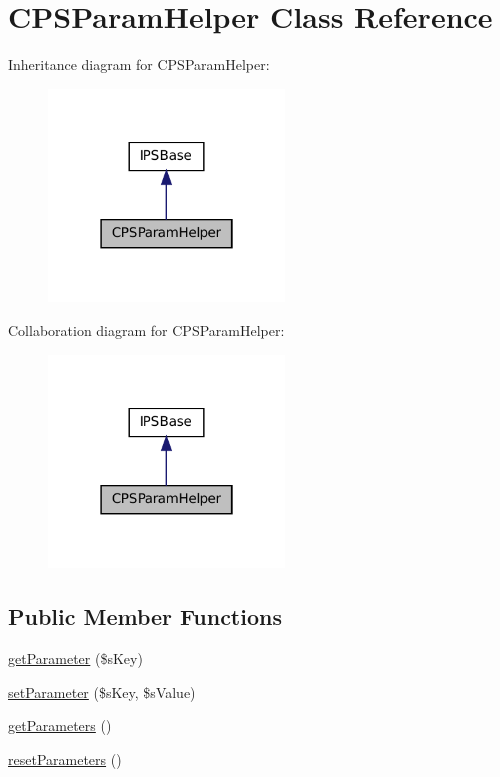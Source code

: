 \hypertarget{classCPSParamHelper}{
\section{CPSParamHelper Class Reference}
\label{classCPSParamHelper}
}


Inheritance diagram for CPSParamHelper:\nopagebreak
\begin{figure}[H]
\begin{center}
\leavevmode
\includegraphics[width=178pt]{classCPSParamHelper__inherit__graph}
\end{center}
\end{figure}


Collaboration diagram for CPSParamHelper:\nopagebreak
\begin{figure}[H]
\begin{center}
\leavevmode
\includegraphics[width=178pt]{classCPSParamHelper__coll__graph}
\end{center}
\end{figure}
\subsection*{Public Member Functions}
\begin{DoxyCompactItemize}
\item 
\hyperlink{classCPSParamHelper_adbe68e5cc8d1aa5d9902864c926b6c30}{getParameter} (\$sKey)
\item 
\hyperlink{classCPSParamHelper_a40f227a458ea32355358fcb19713d6a3}{setParameter} (\$sKey, \$sValue)
\item 
\hyperlink{classCPSParamHelper_a015cb52e5774a1972d296c9694d2a3c3}{getParameters} ()
\item 
\hyperlink{classCPSParamHelper_ab6a0925ece1b5a8a738472b53d11dddf}{resetParameters} ()
\end{DoxyCompactItemize}
